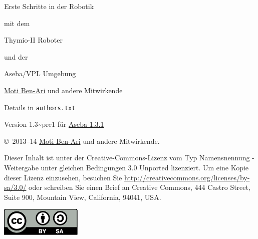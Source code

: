 \thispagestyle{empty}

\begin{center}
\begin{Huge}
\begin{bfseries}
Erste Schritte in der Robotik
\end{bfseries}

mit dem 

\begin{bfseries}
Thymio-II Roboter
\end{bfseries}

und der

\begin{bfseries}
Aseba/VPL Umgebung
\end{bfseries}

\end{Huge}

\vskip 2cm


\begin{LARGE}
\href{http://www.weizmann.ac.il/sci-tea/benari/}{Moti Ben-Ari} und andere Mitwirkende\\
\end{LARGE}
\bigskip
\begin{Large}
Details in \texttt{authors.txt} 
\end{Large}

\vskip 1cm

\begin{Large}
Version 1.3{\textasciitilde}pre1 für \href{https://aseba.wikidot.com/de:downloadinstall}{Aseba 1.3.1}
\end{Large}

\end{center}

\vfill

\begin{center}
\copyright{}\  2013--14 \href{http://www.weizmann.ac.il/sci-tea/benari/}{Moti Ben-Ari} und andere Mitwirkende.
\end{center}

Dieser Inhalt ist unter der Creative-Commons-Lizenz vom Typ Namensnennung -
Weitergabe unter gleichen Bedingungen 3.0 Unported lizenziert.
Um eine Kopie dieser Lizenz einzusehen, besuchen Sie \url{http://creativecommons.org/licenses/by-sa/3.0/} oder schreiben Sie einen Brief an Creative Commons, 444 Castro Street, Suite 900, Mountain View, California, 94041, USA.

\begin{center}
\includegraphics[width=.2\textwidth]{../images/by-sa}
\end{center}
